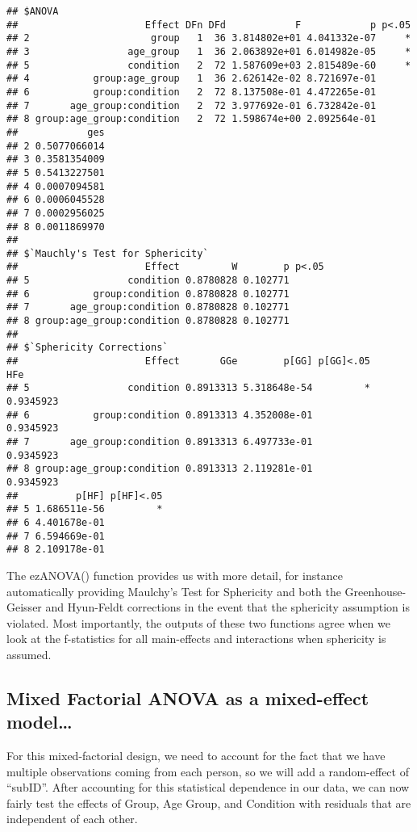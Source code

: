 \documentclass[]{article}
\begin{document}
\begin{verbatim}
## $ANOVA
##                      Effect DFn DFd            F            p p<.05
## 2                     group   1  36 3.814802e+01 4.041332e-07     *
## 3                 age_group   1  36 2.063892e+01 6.014982e-05     *
## 5                 condition   2  72 1.587609e+03 2.815489e-60     *
## 4           group:age_group   1  36 2.626142e-02 8.721697e-01      
## 6           group:condition   2  72 8.137508e-01 4.472265e-01      
## 7       age_group:condition   2  72 3.977692e-01 6.732842e-01      
## 8 group:age_group:condition   2  72 1.598674e+00 2.092564e-01      
##            ges
## 2 0.5077066014
## 3 0.3581354009
## 5 0.5413227501
## 4 0.0007094581
## 6 0.0006045528
## 7 0.0002956025
## 8 0.0011869970
## 
## $`Mauchly's Test for Sphericity`
##                      Effect         W        p p<.05
## 5                 condition 0.8780828 0.102771      
## 6           group:condition 0.8780828 0.102771      
## 7       age_group:condition 0.8780828 0.102771      
## 8 group:age_group:condition 0.8780828 0.102771      
## 
## $`Sphericity Corrections`
##                      Effect       GGe        p[GG] p[GG]<.05       HFe
## 5                 condition 0.8913313 5.318648e-54         * 0.9345923
## 6           group:condition 0.8913313 4.352008e-01           0.9345923
## 7       age_group:condition 0.8913313 6.497733e-01           0.9345923
## 8 group:age_group:condition 0.8913313 2.119281e-01           0.9345923
##          p[HF] p[HF]<.05
## 5 1.686511e-56         *
## 6 4.401678e-01          
## 7 6.594669e-01          
## 8 2.109178e-01
\end{verbatim}

The ezANOVA() function provides us with more detail, for instance
automatically providing Maulchy's Test for Sphericity and both the
Greenhouse-Geisser and Hyun-Feldt corrections in the event that the
sphericity assumption is violated. Most importantly, the outputs of
these two functions agree when we look at the f-statistics for all
main-effects and interactions when sphericity is assumed.

\hypertarget{mixed-factorial-anova-as-a-mixed-effect-model}{%
\subsection{Mixed Factorial ANOVA as a mixed-effect
model\ldots{}}\label{mixed-factorial-anova-as-a-mixed-effect-model}}

For this mixed-factorial design, we need to account for the fact that we
have multiple observations coming from each person, so we will add a
random-effect of ``subID''. After accounting for this statistical
dependence in our data, we can now fairly test the effects of Group, Age
Group, and Condition with residuals that are independent of each other.
\end{document}
